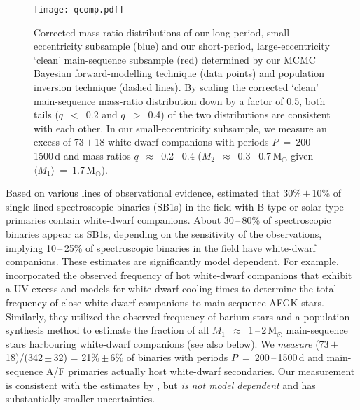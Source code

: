 \documentclass[a4paper,fleqn,usenatbib]{mnras}
\begin{document}
\begin{figure}
\centering
\texttt{[image: qcomp.pdf]}
\caption{Corrected mass-ratio distributions of our long-period, small-eccentricity subsample (blue) and our short-period, large-eccentricity `clean' main-sequence subsample (red) determined by our MCMC Bayesian forward-modelling technique (data points) and population inversion technique (dashed lines).  By scaling the corrected `clean' main-sequence mass-ratio distribution down by a factor of 0.5, both tails ($q$~$<$~0.2 and $q$~$>$~0.4) of the two distributions are consistent with each other.  In our small-eccentricity subsample, we measure an excess of 73\,$\pm$\,18 white-dwarf companions with periods $P$~=~200\,--\,1500\,d and mass ratios $q$~$\approx$~0.2\,--\,0.4 ($M_2$~$\approx$~0.3\,--\,0.7\,M$_{\odot}$ given $\langle M_1 \rangle$~=~1.7\,M$_{\odot}$). }
\label{qcomp}
\end{figure}


Based on various lines of observational evidence, \citet{moe&distefano2017} estimated that 30\%\,$\pm$\,10\% of single-lined spectroscopic binaries (SB1s) in the field with B-type or solar-type primaries contain white-dwarf companions.  About 30\,--\,80\% of spectroscopic binaries appear as SB1s, depending on the sensitivity of the observations, implying 10\,--\,25\% of spectroscopic binaries in the field have white-dwarf companions. These estimates are significantly model dependent.  For example, \citet{moe&distefano2017} incorporated the observed frequency of hot white-dwarf companions that exhibit a UV excess \citep{holbergetal2013} and models for white-dwarf cooling times to determine the total frequency of close white-dwarf companions to main-sequence AFGK stars.  Similarly, they utilized the observed frequency of barium stars \citep[1\%,][]{macconnelletal1972,jorissenetal1998} and a population synthesis method to estimate the fraction of all \mbox{$M_1$~$\approx$~1\,--\,2\,M$_{\odot}$} main-sequence stars harbouring white-dwarf companions (see also below). We {\it measure} (73\,$\pm$\,18)/(342\,$\pm$\,32) = 21\%\,$\pm$\,6\% of binaries with periods $P$~=~200\,--\,1500\,d and main-sequence A/F primaries actually host white-dwarf secondaries.  Our measurement is consistent with the estimates by \citet{moe&distefano2017}, but {\em is not model dependent} and has substantially smaller uncertainties. 
\end{document}
